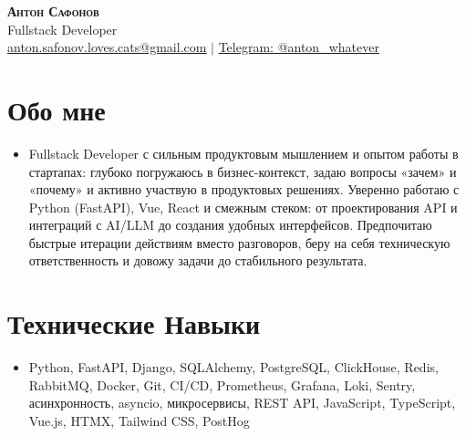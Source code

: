 \documentclass[letterpaper,11pt]{article}
\begin{document}
\vspace*{-50pt}

\begin{center}
    \textbf{\huge \scshape Антон Сафонов} \\ \vspace{-1pt}
    \large Fullstack Developer \\ \vspace{-1pt}
    \small \href{mailto:anton.safonov.loves.cats@gmail.com}{\underline{anton.safonov.loves.cats@gmail.com}} $|$ 
    \href{https://t.me/anton_whatever}{Telegram: \underline{@anton\_whatever}} 
\end{center}

\section{Обо мне}
\small\begin{itemize}[leftmargin=0.15in, label={}]
\item{Fullstack Developer с сильным продуктовым мышлением и опытом работы в стартапах: глубоко погружаюсь в бизнес-контекст, задаю вопросы «зачем» и «почему» и активно участвую в продуктовых решениях. Уверенно работаю с Python (FastAPI), Vue, React и смежным стеком: от проектирования API и интеграций с AI/LLM до создания удобных интерфейсов. Предпочитаю быстрые итерации действиям вместо разговоров, беру на себя техническую ответственность и довожу задачи до стабильного результата.}
\end{itemize}
\section{Технические Навыки}
 \begin{itemize}[leftmargin=0.15in, label={}]
    \item Python, FastAPI, Django, SQLAlchemy, PostgreSQL, ClickHouse, Redis, RabbitMQ, Docker, Git, CI/CD, Prometheus, Grafana, Loki, Sentry, асинхронность, asyncio, микросервисы, REST API, JavaScript, TypeScript, Vue.js, HTMX, Tailwind CSS, PostHog
 \end{itemize}
\end{document}

